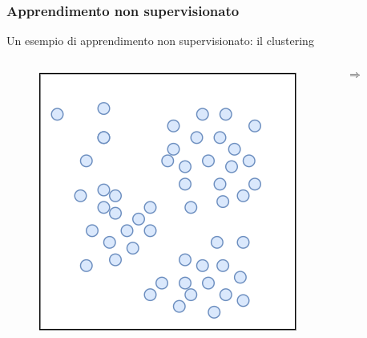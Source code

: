 \begin{frame}

	\frametitle{Apprendimento non supervisionato}

	\begin{block}{Un esempio di apprendimento non supervisionato: il clustering}
	
		
		\begin{columns}
			\begin{figure}[!htbp]
				\centering
				\includegraphics[width=1.0\linewidth]{images/glossary/unsupervised_learning_1_1.png}
			\end{figure}
			
			\begin{Huge}
				$$\pmb{\Rightarrow}$$
			\end{Huge}
			
			\pause


\end{columns}
\end{block}
\end{frame}
